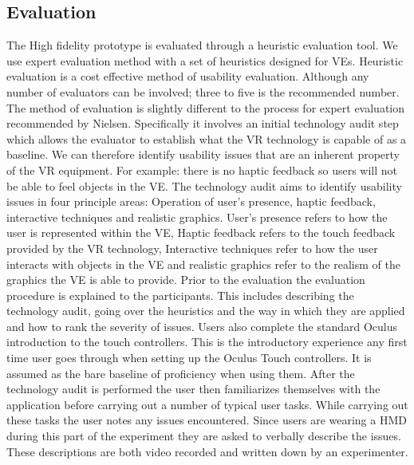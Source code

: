 \documentclass{article}
\begin{document}
\subsection{Evaluation}
The High fidelity prototype is evaluated through a heuristic evaluation tool\cite{Bowman2002}. We use expert evaluation method with a set of heuristics designed for VEs\cite{Sutcliffe2004}. Heuristic evaluation is a cost effective method of usability evaluation\cite{nielsen1990heuristic}. Although any number of evaluators can be involved; three to five is the recommended number\cite{nielsen1990heuristic}.
\newline\newline
The method of evaluation is slightly different to the process for expert evaluation recommended by Nielsen\cite{Sutcliffe2004}. Specifically it involves an initial technology audit step which allows the evaluator to establish what the VR technology is capable of as a baseline. We can therefore identify usability issues that are an inherent property of the VR equipment. For example: there is no haptic feedback so users will not be able to feel objects in the VE. The technology audit aims to identify usability issues in four principle areas: Operation of user's presence, haptic feedback, interactive techniques and realistic graphics. User's presence refers to how the user is represented within the VE, Haptic feedback refers to the touch feedback provided by the VR technology, Interactive techniques refer to how the user interacts with objects in the VE and realistic graphics refer to the realism of the graphics the VE is able to provide.
\newline\newline
Prior to the evaluation the evaluation procedure is explained to the participants. This includes describing the technology audit, going over the heuristics and the way in which they are applied and how to rank the severity of issues. Users also complete the standard Oculus introduction to the touch controllers. This is the introductory experience any first time user goes through when setting up the Oculus Touch controllers. It is assumed as the bare baseline of proficiency when using them.
\newline\newline
After the technology audit is performed the user then familiarizes themselves with the application before carrying out a number of typical user tasks. While carrying out these tasks the user notes any issues encountered. Since users are wearing a HMD during this part of the experiment they are asked to verbally describe the issues. These descriptions are both video recorded and written down by an experimenter.
\end{document}
